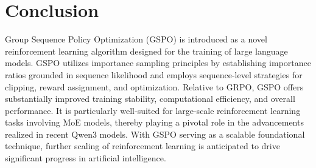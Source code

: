 \section{Conclusion}

Group Sequence Policy Optimization (GSPO) is introduced as a novel reinforcement learning algorithm designed for the training of large language models. GSPO utilizes importance sampling principles by establishing importance ratios grounded in sequence likelihood and employs sequence-level strategies for clipping, reward assignment, and optimization. Relative to GRPO, GSPO offers substantially improved training stability, computational efficiency, and overall performance. It is particularly well-suited for large-scale reinforcement learning tasks involving MoE models, thereby playing a pivotal role in the advancements realized in recent Qwen3 models. With GSPO serving as a scalable foundational technique, further scaling of reinforcement learning is anticipated to drive significant progress in artificial intelligence.

